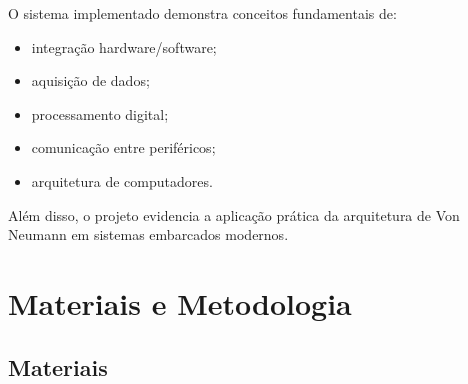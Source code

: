 \documentclass[a4paper,12pt]{article}
\begin{document}
O sistema implementado demonstra conceitos fundamentais de:
\begin{itemize}
    \item integração hardware/software;
    \item aquisição de dados;
    \item processamento digital;
    \item comunicação entre periféricos;
    \item arquitetura de computadores.
\end{itemize}

Além disso, o projeto evidencia a aplicação prática da arquitetura de Von Neumann em sistemas embarcados modernos.

\section{Materiais e Metodologia}

\subsection{Materiais}
\end{document}
